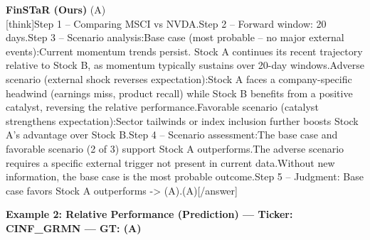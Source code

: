 \begin{minipage}[t]{0.41\textwidth}
\colorbox{green!10}{\parbox{\dimexpr\textwidth-2\fboxsep}{
\textbf{FinSTaR (Ours)} \textcolor{green!50!black}{(A)} \\[2pt]
\tiny
[think]\newline Step 1 -- Comparing MSCI vs NVDA.\newline Step 2 -- Forward window: 20 days.\newline Step 3 -- Scenario analysis:\newline   Base case (most probable -- no major external events):\newline     Current momentum trends persist. Stock A continues its recent trajectory relative to Stock B, as momentum typically sustains over 20-day windows.\newline   Adverse scenario (external shock reverses expectation):\newline     Stock A faces a company-specific headwind (earnings miss, product recall) while Stock B benefits from a positive catalyst, reversing the relative performance.\newline   Favorable scenario (catalyst strengthens expectation):\newline     Sector tailwinds or index inclusion further boosts Stock A's advantage over Stock B.\newline Step 4 -- Scenario assessment:\newline   The base case and favorable scenario (2 of 3) support Stock A outperforms.\newline   The adverse scenario requires a specific external trigger not present in current data.\newline   Without new information, the base case is the most probable outcome.\newline Step 5 -- Judgment: Base case favors Stock A outperforms -> (A).\newline [/think]\newline [answer](A)[/answer]
}}
\end{minipage}
\vspace{8pt}


\noindent
\textbf{Example 2: Relative Performance (Prediction) --- Ticker: CINF\_GRMN --- GT: (A)}
\vspace{2pt}

